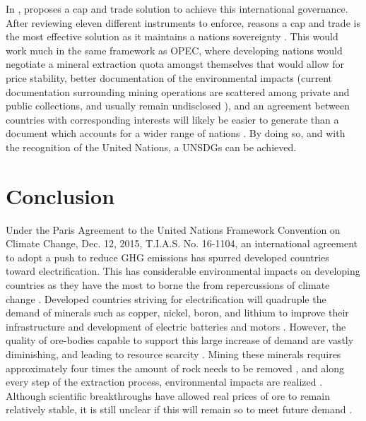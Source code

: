 \documentclass[12pt]{article}
\begin{document}
In , \citeauthor{Book:Governance_Resources} proposes a cap and trade solution to achieve this international governance. After reviewing eleven different instruments to enforce, \citeauthor{Book:Governance_Resources} reasons a cap and trade is the most effective solution as it maintains a nations sovereignty \cite{Book:Governance_Resources}. This would work much in the same framework as OPEC, where developing nations would negotiate a mineral extraction quota amongst themselves that would allow for price stability, better documentation of the environmental impacts (current documentation surrounding mining operations are scattered among private and public collections, and usually remain undisclosed \cite{Book:MRG_Sustainable_Report}), and an agreement between countries with corresponding interests will likely be easier to generate than a document which accounts for a wider range of nations \cite{Book:Governance_Resources}. By doing so, and with the recognition of the United Nations, a UNSDGs can be achieved. 

\section{Conclusion}

Under the Paris Agreement to the United Nations Framework Convention on Climate Change, Dec. 12, 2015, T.I.A.S. No. 16-1104, an international agreement to adopt a push to reduce GHG emissions has spurred developed countries toward electrification. This has considerable environmental impacts on developing countries as they have the most to borne the from repercussions of climate change \cite{Report:IEA_Executive_Summary}. Developed countries striving for electrification will quadruple the demand of minerals such as copper, nickel, boron, and lithium \cite{Report:IEA_Executive_Summary, News:Environmental_Regulation} to improve their infrastructure and development of electric batteries and motors \cite{Report:IEA_Executive_Summary}. However, the quality of ore-bodies capable to support this large increase of demand are vastly diminishing, and leading to resource scarcity \cite{Book:Governance_Resources, Book:Metal_Recycling, Report:IEA_Executive_Summary, News:Environmental_Regulation}. Mining these minerals requires approximately four times the amount of rock needs to be removed \cite{Article:Mining_Industry}, and along every step of the extraction process, environmental impacts are realized \cite{Article:Mining_Industry}. Although scientific breakthroughs have allowed real prices of ore to remain relatively stable, it is still unclear if this will remain so to meet future demand \cite{Book:Governance_Resources}.
\end{document}

